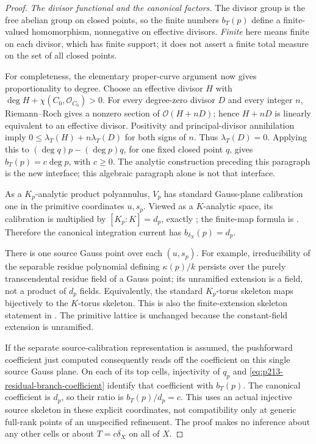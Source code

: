 \begin{proof}
\emph{The divisor functional and the canonical factors.}
The divisor group is the free abelian group on closed points,
so the finite numbers \(b_T(p)\) define a finite-valued
homomorphism, nonnegative on effective divisors. \emph{Finite}
here means finite on each divisor, which has finite support;
it does not assert a finite total measure on the set of all
closed points.

For completeness, the elementary proper-curve argument now
gives proportionality to degree. Choose an effective divisor
\(H\) with \(\deg H+\chi(C_0,\mathcal O_{C_0})>0\).
For every degree-zero divisor \(D\) and every integer \(n\),
Riemann--Roch gives a nonzero section of \(\mathcal O(H+nD)\);
hence \(H+nD\) is linearly equivalent to an effective divisor.
Positivity and principal-divisor annihilation imply
\(0\leq\lambda_T(H)+n\lambda_T(D)\) for both signs of \(n\).
Thus \(\lambda_T(D)=0\). Applying this to
\((\deg q)p-(\deg p)q\), for one fixed closed point \(q\),
gives \(b_T(p)=c\deg p\), with \(c\geq0\).
The analytic construction preceding this paragraph is the new
interface; this algebraic paragraph alone is not that interface.

As a \(K_p\)-analytic product polyannulus, \(V_p\) has standard
Gauss-plane calibration one in the primitive coordinates
\(u,s_p\). Viewed as a \(K\)-analytic space, its calibration
is multiplied by \([K_p:K]=d_p\), exactly
\cite[Remark 14.4.3, p.~410]{CLD25}; the finite-map formula is
\cite[Proposition 14.4.2, pp.~409--410]{CLD25}.
Therefore the canonical integration current has
\(b_{\delta_X}(p)=d_p\).

There is one source Gauss point over each \((u,s_p)\).
For example, irreducibility of the separable residue polynomial
defining \(\kappa(p)/k\) persists over the purely transcendental
residue field of a Gauss point; its unramified extension is a
field, not a product of \(d_p\) fields. Equivalently, the standard
\(K_p\)-torus skeleton maps bijectively to the \(K\)-torus
skeleton. This is also the finite-extension skeleton statement
in \cite[Remark 14.4.3]{CLD25}. The primitive lattice is unchanged
because the constant-field extension is unramified.

If the separate source-calibration representation is assumed,
the pushforward coefficient just computed consequently reads
off the coefficient on this single source Gauss plane. On each
of its top cells, injectivity of \(q_p\) and
\eqref{eq:p213-residual-branch-coefficient} identify that
coefficient with \(b_T(p)\). The canonical coefficient is \(d_p\),
so their ratio is \(b_T(p)/d_p=c\).
This uses an actual injective source skeleton in these explicit
coordinates, not compatibility only at generic full-rank points
of an unspecified refinement. The proof makes no inference
about any other cells or about \(T=c\delta_X\) on all of \(X\).
\end{proof}
